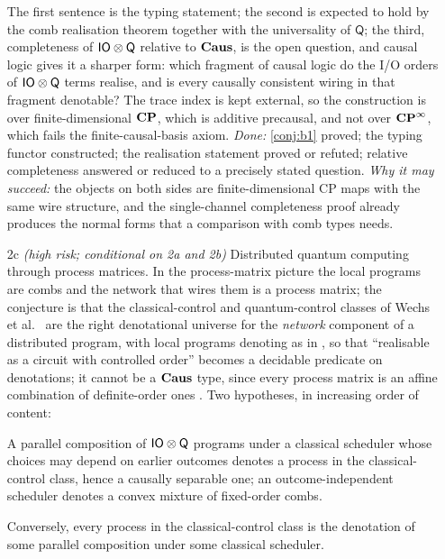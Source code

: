 \begin{itemize}[nosep]
\noindent The first sentence is the typing statement; the second is expected to hold by the comb realisation theorem \cite{chiribella2009networks} together with the universality of $\mathsf{Q}$; the third, completeness of $\iotq$ relative to $\CausC$, is the open question, and causal logic \cite{simmons2024thesis,simmons2024completelogic} gives it a sharper form: which fragment of causal logic do the I/O orders of $\iotq$ terms realise, and is every causally consistent wiring in that fragment denotable? The trace index is kept external, so the construction is over finite-dimensional $\CP$, which is additive precausal, and not over $\CPinf$, which fails the finite-causal-basis axiom. \emph{Done:} \ref{conj:b1} proved; the typing functor constructed; the realisation statement proved or refuted; relative completeness answered or reduced to a precisely stated question. \emph{Why it may succeed:} the objects on both sides are finite-dimensional CP maps with the same wire structure, and the single-channel completeness proof already produces the normal forms that a comparison with comb types needs.
\item[2c] \textit{(high risk; conditional on 2a and 2b)} Distributed quantum computing through process matrices. In the process-matrix picture the local programs are combs and the network that wires them is a process matrix; the conjecture is that the classical-control and quantum-control classes of Wechs et al.\ \cite{wechs2021qcqc} are the right denotational universe for the \emph{network} component of a distributed program, with local programs denoting as in , so that ``realisable as a circuit with controlled order'' becomes a decidable predicate on denotations; it cannot be a $\CausC$ type, since every process matrix is an affine combination of definite-order ones \cite{simmons2024thesis}. Two hypotheses, in increasing order of content:
\begin{hyp}\label{hyp:sched}
A parallel composition of $\iotq$ programs under a classical scheduler whose choices may depend on earlier outcomes denotes a process in the classical-control class, hence a causally separable one; an outcome-independent scheduler denotes a convex mixture of fixed-order combs.
\end{hyp}
\begin{hyp}\label{hyp:conv}
Conversely, every process in the classical-control class is the denotation of some parallel composition under some classical scheduler.
\end{hyp}

\end{itemize}
